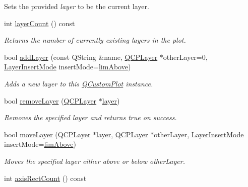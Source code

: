 \begin{DoxyCompactItemize}
\begin{DoxyCompactList}
Sets the provided {\itshape layer} to be the current layer. \end{DoxyCompactList}\item 
int \hyperlink{classQCustomPlot_a1b3926884f5bd4bdda1495d8b3c891d0}{layer\+Count} () const 
\begin{DoxyCompactList}\small\item\em Returns the number of currently existing layers in the plot. \end{DoxyCompactList}\item 
bool \hyperlink{classQCustomPlot_ad5255393df078448bb6ac83fa5db5f52}{add\+Layer} (const Q\+String \&name, \hyperlink{classQCPLayer}{Q\+C\+P\+Layer} $\ast$other\+Layer=0, \hyperlink{classQCustomPlot_a75a8afbe6ef333b1f3d47abb25b9add7}{Layer\+Insert\+Mode} insert\+Mode=\hyperlink{classQCustomPlot_a75a8afbe6ef333b1f3d47abb25b9add7a062b0b7825650b432a713c0df6742d41}{lim\+Above})
\begin{DoxyCompactList}\small\item\em Adds a new layer to this \hyperlink{classQCustomPlot}{Q\+Custom\+Plot} instance. \end{DoxyCompactList}\item 
bool \hyperlink{classQCustomPlot_a40f75e342c5eaab6a86066a42a0e2a94}{remove\+Layer} (\hyperlink{classQCPLayer}{Q\+C\+P\+Layer} $\ast$\hyperlink{classQCustomPlot_aac492da01782820454e9136a8db28182}{layer})
\begin{DoxyCompactList}\small\item\em Removes the specified {\itshape layer} and returns true on success. \end{DoxyCompactList}\item 
bool \hyperlink{classQCustomPlot_ae896140beff19424e9e9e02d6e331104}{move\+Layer} (\hyperlink{classQCPLayer}{Q\+C\+P\+Layer} $\ast$\hyperlink{classQCustomPlot_aac492da01782820454e9136a8db28182}{layer}, \hyperlink{classQCPLayer}{Q\+C\+P\+Layer} $\ast$other\+Layer, \hyperlink{classQCustomPlot_a75a8afbe6ef333b1f3d47abb25b9add7}{Layer\+Insert\+Mode} insert\+Mode=\hyperlink{classQCustomPlot_a75a8afbe6ef333b1f3d47abb25b9add7a062b0b7825650b432a713c0df6742d41}{lim\+Above})
\begin{DoxyCompactList}\small\item\em Moves the specified {\itshape layer} either above or below {\itshape other\+Layer}. \end{DoxyCompactList}\item 
int \hyperlink{classQCustomPlot_a340fa24b1607e445cedda9685670ead3}{axis\+Rect\+Count} () const 

\end{DoxyCompactItemize}

